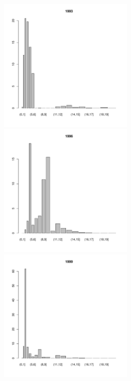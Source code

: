 \documentclass[12pt, a4paper]{article}
\begin{document}
\begin{figure}[h]
\begin{multicols}{3}
\end{multicols}



\begin{multicols}{3}
\hfill
\includegraphics[width=65mm]{../White_Sea/Estuatiy_Luvenga/sizestr_percents_1993_.pdf}
\hfill
\includegraphics[width=65mm]{../White_Sea/Estuatiy_Luvenga/sizestr_percents_1996_.pdf}
\hfill
\includegraphics[width=65mm]{../White_Sea/Estuatiy_Luvenga/sizestr_percents_1999_.pdf}

\end{multicols}



\end{figure}
\end{document}
